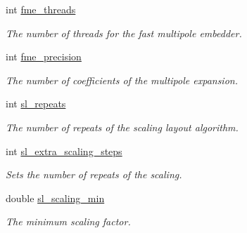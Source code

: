 \begin{DoxyCompactItemize}
int \hyperlink{structLayoutConfiguration_ab356194e6ee8b8ad276fd196b540ac02}{fme\+\_\+threads}
\begin{DoxyCompactList}\small\item\em The number of threads for the fast multipole embedder. \end{DoxyCompactList}\item 
\mbox{\label{structLayoutConfiguration_a086e941fb5a53c068de377f740e330d7}} 
int \hyperlink{structLayoutConfiguration_a086e941fb5a53c068de377f740e330d7}{fme\+\_\+precision}
\begin{DoxyCompactList}\small\item\em The number of coefficients of the multipole expansion. \end{DoxyCompactList}\item 
\mbox{\label{structLayoutConfiguration_ac48f682786c633d2e43c7ae83fa400e0}} 
int \hyperlink{structLayoutConfiguration_ac48f682786c633d2e43c7ae83fa400e0}{sl\+\_\+repeats}
\begin{DoxyCompactList}\small\item\em The number of repeats of the scaling layout algorithm. \end{DoxyCompactList}\item 
\mbox{\label{structLayoutConfiguration_a5f21efd9d16cb86fde8c9f273ae8a05f}} 
int \hyperlink{structLayoutConfiguration_a5f21efd9d16cb86fde8c9f273ae8a05f}{sl\+\_\+extra\+\_\+scaling\+\_\+steps}
\begin{DoxyCompactList}\small\item\em Sets the number of repeats of the scaling. \end{DoxyCompactList}\item 
\mbox{\label{structLayoutConfiguration_a267835cca2b8e0d694b7709009d7eaa5}} 
double \hyperlink{structLayoutConfiguration_a267835cca2b8e0d694b7709009d7eaa5}{sl\+\_\+scaling\+\_\+min}
\begin{DoxyCompactList}\small\item\em The minimum scaling factor. \end{DoxyCompactList}\item 
\mbox{\label{structLayoutConfiguration_a96f6f38497727a3844acab6be2ae021a}} 

\end{DoxyCompactItemize}
